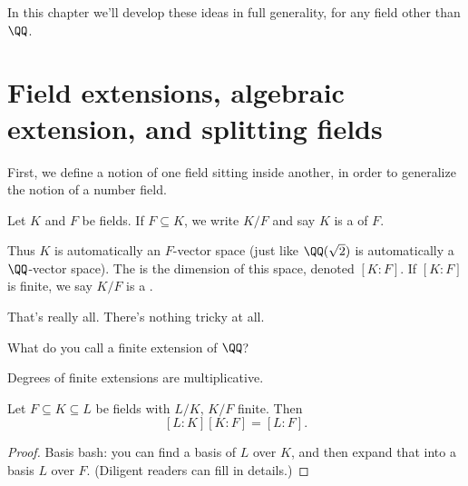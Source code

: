 In this chapter we'll develop these ideas in full generality, for any field other than $\QQ$.

\section{Field extensions, algebraic extension, and splitting fields}

First, we define a notion of one field sitting inside another,
in order to generalize the notion of a number field.
\begin{definition}
	Let $K$ and $F$ be fields.
	If $F \subseteq K$, we write $K/F$ and say $K$ is a
	 of $F$.

	Thus $K$ is automatically an $F$-vector space
	(just like $\QQ(\sqrt 2)$ is automatically a $\QQ$-vector space).
	The  is the dimension of this space, denoted $[K:F]$.
	If $[K:F]$ is finite, we say $K/F$ is a .
\end{definition}
That's really all. There's nothing tricky at all.

\begin{ques}
	What do you call a finite extension of $\QQ$?
\end{ques}

Degrees of finite extensions are multiplicative.
\begin{theorem}
	Let $F \subseteq K \subseteq L$ be fields with $L/K$, $K/F$ finite. Then
	\[ [L:K][K:F] = [L:F]. \]
\end{theorem}
\begin{proof}
	Basis bash: you can find a basis of $L$ over $K$,
	and then expand that into a basis $L$ over $F$.
	(Diligent readers can fill in details.)
\end{proof}

